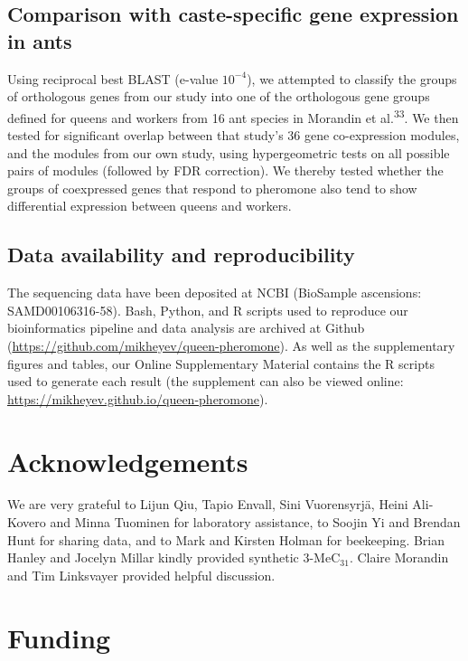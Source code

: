 \documentclass[12pt,]{article}
\begin{document}
\subsection{Comparison with caste-specific gene expression in
ants}\label{comparison-with-caste-specific-gene-expression-in-ants-1}

Using reciprocal best BLAST (e-value \(10^{-4}\)), we attempted to
classify the groups of orthologous genes from our study into one of the
orthologous gene groups defined for queens and workers from 16 ant
species in Morandin et al.\textsuperscript{33}. We then tested for
significant overlap between that study's 36 gene co-expression modules,
and the modules from our own study, using hypergeometric tests on all
possible pairs of modules (followed by FDR correction). We thereby
tested whether the groups of coexpressed genes that respond to pheromone
also tend to show differential expression between queens and workers.

\subsection{Data availability and
reproducibility}\label{data-availability-and-reproducibility}

The sequencing data have been deposited at NCBI (BioSample ascensions:
SAMD00106316-58). Bash, Python, and R scripts used to reproduce our
bioinformatics pipeline and data analysis are archived at Github
(\url{https://github.com/mikheyev/queen-pheromone}). As well as the
supplementary figures and tables, our Online Supplementary Material
contains the R scripts used to generate each result (the supplement can
also be viewed online:
\url{https://mikheyev.github.io/queen-pheromone}).

\section{Acknowledgements}\label{acknowledgements}

We are very grateful to Lijun Qiu, Tapio Envall, Sini Vuorensyrjä, Heini
Ali-Kovero and Minna Tuominen for laboratory assistance, to Soojin Yi
and Brendan Hunt for sharing data, and to Mark and Kirsten Holman for
beekeeping. Brian Hanley and Jocelyn Millar kindly provided synthetic
3-MeC\(_{31}\). Claire Morandin and Tim Linksvayer provided helpful
discussion.

\section{Funding}\label{funding}
\end{document}
